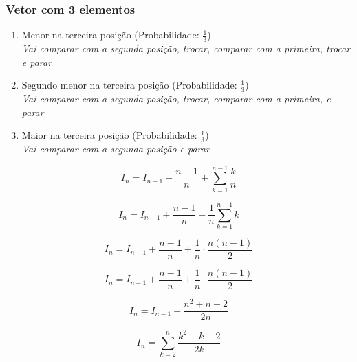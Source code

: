\documentclass{article}
\begin{document}

\subsubsection{Vetor com 3 elementos}
\begin{enumerate}
\item {Menor na terceira posição (Probabilidade: $\frac{1}{3}$)\\}
    \em{Vai comparar com a segunda posição, trocar, comparar com a primeira, trocar e parar\\}
\item {Segundo menor na terceira posição (Probabilidade: $\frac{1}{3}$)\\}
    \em{Vai comparar com a segunda posição, trocar, comparar com a primeira, e parar\\}
\item {Maior na terceira posição (Probabilidade: $\frac{1}{3}$)\\}
    \em{Vai comparar com a segunda posição e parar\\}
\end{enumerate}




\begin{equation}
I_n = I_{n-1} + \frac{n-1}{n} + \sum_{k = 1}^{n-1} \frac{k}{n} 
\end{equation}

\begin{equation}
    I_n = I_{n-1} + \frac{n-1}{n} + \frac{1}{n}\sum_{k = 1}^{n-1} k
\end{equation}

\begin{equation}
    I_n = I_{n-1} + \frac{n-1}{n} + \frac{1}{n} \cdot \frac{n(n-1)}{2}
\end{equation}

\begin{equation}
    I_n = I_{n-1} + \frac{n-1}{n} + \frac{1}{n} \cdot \frac{n(n-1)}{2}
\end{equation}

\begin{equation}
    I_n = I_{n-1} + \frac{n^2 + n - 2}{2n} 
\end{equation}


\begin{equation}
    I_n = \sum_{k = 2}^{n} \frac{k^2 + k - 2}{2k} 
\end{equation}

\end{document}
